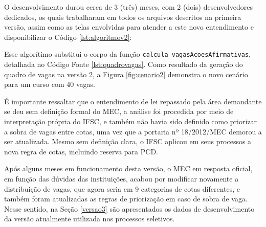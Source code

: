 \newpage
O desenvolvimento durou cerca de 3 (três) meses, com 2 (dois) desenvolvedores dedicados, os quais trabalharam em todos os arquivos descritos na primeira versão, assim como as telas envolvidas para atender a este novo entendimento e disponibilizar o Código \ref{lst:algoritmov2}:



Esse algorítimo substitui o corpo da função \texttt{calcula\_vagasAcoesAfirmativas}, detalhada no Código Fonte \ref{lst:quadrovagas}. Como resultado da geração do quadro de vagas na versão 2, a Figura \ref{fig:cenario2} demonstra o novo cenário para um curso com 40 vagas.



É importante ressaltar que o entendimento de lei repassado pela área demandante se deu sem definição formal do \gls{MEC}, a análise foi procedida por meio de interpretação própria do \gls{IFSC}, e também não havia sido definido como priorizar a sobra de vagas entre cotas, uma vez que a portaria nº 18/2012/MEC  demorou a ser atualizada. Mesmo sem definição clara, o \gls{IFSC} aplicou em seus processos a nova regra de cotas, incluindo reserva para \gls{PCD}.

Após alguns meses em funcionamento desta versão, o \gls{MEC} em resposta oficial, em função das dúvidas das instituições, acabou por modificar novamente a distribuição de vagas, que agora seria em 9 categorias de cotas diferentes, e também foram atualizadas as regras de priorização em caso de sobra de vaga. Nesse sentido, na Seção \ref{versao3} são apresentados os dados de desenvolvimento da versão atualmente utilizada nos processos seletivos.